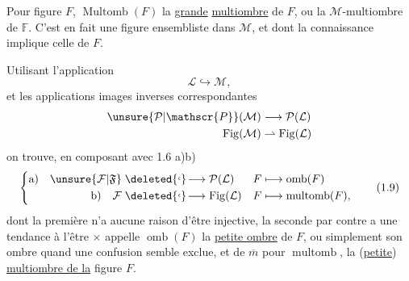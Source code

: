 
Pour  figure $F$, $\operatorname{Multomb}(F)$   la \uline{grande} \uline{multiombre} de $F$, ou la $\mathcal{M}$-multiombre de $\mathbb{F}$.  C'est en fait une figure ensembliste dans $\mathcal{M}$, et dont la connaissance implique celle de $F$.

 Utilisant   l'application
\[
\mathcal{L}\hookrightarrow\mathcal{M},
\]
et les applications images inverses correspondantes
\[
\begin{aligned}
\unsure{\mathcal{P}|\mathscr{P}}(\mathcal{M})&\longrightarrow\mathcal{P}(\mathcal{L})\\
\operatorname{Fig}(\mathcal{M})&\rightharpoonup\operatorname{Fig}(\mathcal{L})
\end{aligned}
\]
on trouve, en composant avec 1.6 a)b)
\[
\left\{\begin{aligned}
\text{a)}\quad \unsure{\mathcal{F}|\mathfrak{F}}&\mathrel{\deleted{\lhook}\!\longrightarrow}\mathcal{P}(\mathcal{L})&
 F&\longmapsto\operatorname{omb}(F)\\
\text{b)}\quad \mathcal{F}&\mathrel{\deleted{\lhook}\!\longrightarrow}\operatorname{Fig}(\mathcal{L})&
 F&\longmapsto\operatorname{multomb}(F),
\end{aligned}\right.\tag*{(1.9)}
\]
dont la première n'a aucune raison d'être injective, la seconde par contre a une tendance à l'être $\times$   appelle $\operatorname{omb}(F)$ la \uline{petite ombre} de $F$, ou simplement son ombre quand une confusion semble exclue, et de $\overline m$ pour $\operatorname{multomb}$, la (\uline{petite}) \uline{multiombre de la} figure $F$.

